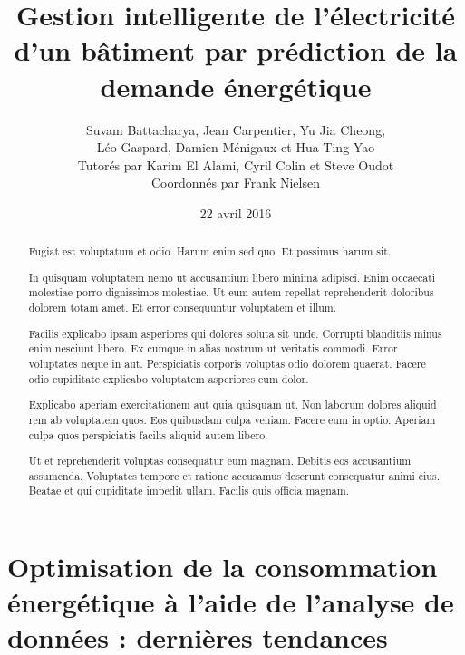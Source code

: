 \documentclass[a4paper]{article}
\author{Suvam Battacharya, Jean Carpentier, Yu Jia Cheong,\\
Léo Gaspard, Damien Ménigaux et Hua Ting Yao\\
Tutorés par Karim El Alami, Cyril Colin et Steve Oudot\\
Coordonnés par Frank Nielsen}
\title{Gestion intelligente de l'électricité d'un bâtiment par prédiction de la
demande énergétique}
\date{22 avril 2016}
\begin{document}
\maketitle
\clearpage

\renewcommand{\abstractname}{Préambule}
\begin{abstract}

Fugiat est voluptatum et odio. Harum enim sed quo. Et possimus harum sit.

In quisquam voluptatem nemo ut accusantium libero minima adipisci. Enim
    occaecati molestiae porro dignissimos molestiae. Ut eum autem repellat
    reprehenderit doloribus dolorem totam amet. Et error consequuntur voluptatem
    et illum.

Facilis explicabo ipsam asperiores qui dolores soluta sit unde. Corrupti
    blanditiis minus enim nesciunt libero. Ex cumque in alias nostrum ut
    veritatis commodi. Error voluptates neque in aut. Perspiciatis corporis
    voluptas odio dolorem quaerat. Facere odio cupiditate explicabo voluptatem
    asperiores eum dolor.

Explicabo aperiam exercitationem aut quia quisquam ut. Non laborum dolores
    aliquid rem ab voluptatem quos. Eos quibusdam culpa veniam. Facere eum in
    optio. Aperiam culpa quos perspiciatis facilis aliquid autem libero.

Ut et reprehenderit voluptas consequatur eum magnam. Debitis eos accusantium
    assumenda. Voluptates tempore et ratione accusamus deserunt consequatur
    animi eius. Beatae et qui cupiditate impedit ullam. Facilis quis officia
    magnam.

\end{abstract}
\clearpage

\tableofcontents
\clearpage
{}
\section{Optimisation de la consommation énergétique à l’aide de l’analyse de données : dernières tendances}
\end{document}
